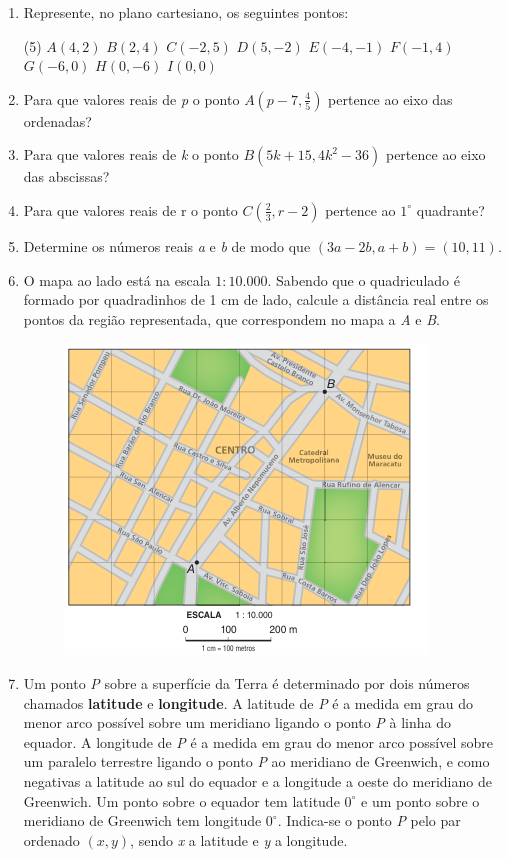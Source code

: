 \begin{enumerate}[label*=\protect\fbox{\arabic{enumi}}]
  \item Represente, no plano cartesiano, os seguintes pontos:
    \begin{tasks}(5)
      \task $A(4,2)$
      \task $B(2,4)$
      \task $C(-2,5)$
      \task $D(5,-2)$
      \task $E(-4,-1)$
      \task $F(-1,4)$
      \task $G(-6,0)$
      \task $H(0,-6)$
      \task $I(0,0)$
    \end{tasks}

  \item Para que valores reais de \textit{p} o ponto $A(p-7, \frac{4}{5})$ pertence ao eixo das ordenadas?
  \item Para que valores reais de \textit{k} o ponto $B(5k+15, 4k^2-36)$ pertence ao eixo das abscissas?
  \item Para que valores reais de r o ponto $C(\frac{2}{3}, r - 2)$ pertence ao $1^\circ$ quadrante?
  \item Determine os números reais \textit{a} e \textit{b} de modo que $(3a-2b, a+b) = (10, 11)$.
  \item O mapa ao lado está na escala $1 : 10.000$. Sabendo que o quadriculado é formado por quadradinhos de 1 cm de lado, 
    calcule a distância real entre os pontos da região representada, que correspondem no mapa a \textit{A} e \textit{B}.

    \begin{figure}[H]
      \centering
      \includegraphics[width=.5\linewidth]{figures/1.png}
    \end{figure}

  \item Um ponto \textit{P} sobre a superfície da Terra é determinado por dois números chamados \textbf{latitude} e \textbf{longitude}. 
    A latitude de \textit{P} é a medida em grau do menor arco possível sobre um meridiano ligando o ponto \textit{P} à linha do equador. 
    A longitude de \textit{P} é a medida em grau do menor arco possível sobre um paralelo terrestre ligando o ponto \textit{P} ao meridiano 
    de Greenwich, e como negativas a latitude ao sul do equador e a longitude a oeste do meridiano de Greenwich. Um ponto sobre o equador tem 
    latitude $0^\circ$ e um ponto sobre o meridiano de Greenwich tem longitude $0^\circ$. Indica-se 
    o ponto \textit{P} pelo par ordenado $(x, y)$, sendo \textit{x} a latitude e \textit{y} a longitude. 


\end{enumerate}
